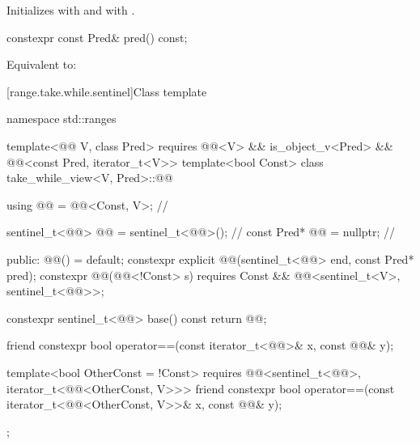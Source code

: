 \begin{itemdescr}
\pnum
\effects
Initializes  with  and
 with .
\end{itemdescr}

%
\begin{itemdecl}
constexpr const Pred& pred() const;
\end{itemdecl}

\begin{itemdescr}
\pnum
\effects
Equivalent to: 
\end{itemdescr}

[range.take.while.sentinel]{Class template }

%
\begin{codeblock}
namespace std::ranges {
  template<@@ V, class Pred>
    requires @@<V> && is_object_v<Pred> &&
             @@<const Pred, iterator_t<V>>
  template<bool Const>
  class take_while_view<V, Pred>::@@ {
    using @@ = @@<Const, V>;                 // \expos

    sentinel_t<@@> @@ = sentinel_t<@@>();         // \expos
    const Pred* @@ = nullptr;                        // \expos

  public:
    @@() = default;
    constexpr explicit @@(sentinel_t<@@> end, const Pred* pred);
    constexpr @@(@@<!Const> s)
      requires Const && @@<sentinel_t<V>, sentinel_t<@@>>;

    constexpr sentinel_t<@@> base() const { return @@; }

    friend constexpr bool operator==(const iterator_t<@@>& x, const @@& y);

    template<bool OtherConst = !Const>
      requires @@<sentinel_t<@@>, iterator_t<@@<OtherConst, V>>>
    friend constexpr bool operator==(const iterator_t<@@<OtherConst, V>>& x,
                                     const @@& y);
  };
}
\end{codeblock}

